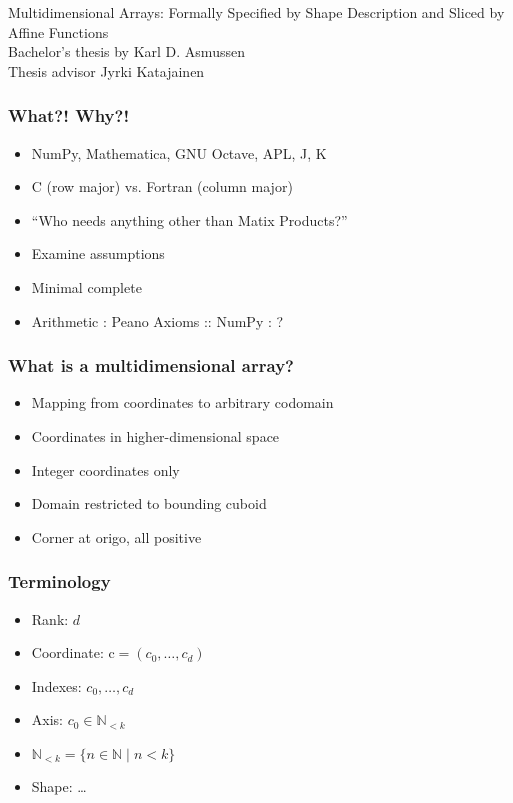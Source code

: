 \documentclass[xetex,mathserif,serif]{beamer}
\newcommand\mrm[1]{\mathrm{#1}}
\newcommand\brm[1]{\bm{\mrm{#1}}}
\newcommand\Nat{\mathbb{N}}
\begin{document}
\begin{frame}
  \begin{center}
    {\Large Multidimensional Arrays: Formally Specified by Shape Description and Sliced by Affine Functions}\\[1em]
    Bachelor's thesis by Karl D. Asmussen \\
    Thesis advisor Jyrki Katajainen
  \end{center}
\end{frame}

\begin{frame}
  \frametitle{What?! Why?!}
  \begin{itemize}%
    \item NumPy, Mathematica, GNU Octave, APL, J, K
    \item C (row major) vs. Fortran (column major)
    \item ``Who needs anything other than Matix Products?''
    \item Examine assumptions
    \item Minimal complete
    \item Arithmetic : Peano Axioms :: NumPy : ?
  \end{itemize}
\end{frame}

\begin{frame}
  \frametitle{What is a multidimensional array?}
  \begin{itemize}%
    \item Mapping from coordinates to arbitrary codomain
    \item Coordinates in higher-dimensional space
    \item Integer coordinates only
    \item Domain restricted to bounding cuboid
    \item Corner at origo, all positive
  \end{itemize}
\end{frame}

\begin{frame}
  \frametitle{Terminology}
  \begin{itemize}%
    \item Rank: \(d\)
    \item Coordinate: \(\brm c = (c_0,\dots,c_d)\)
    \item Indexes: \(c_0,\dots,c_d\)
    \item Axis: \(c_0 \in \Nat_{<k}\)
    \item \(\Nat_{<k} = \{ n \in \Nat \mid n < k \}\)
    \item Shape: \dots
  \end{itemize}
\end{frame}
\end{document}
